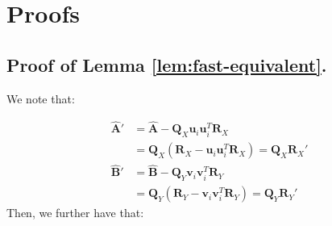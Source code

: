 \appendix
\section{Proofs}\label{app:proofs}

\subsection{Proof of Lemma \ref{lem:fast-equivalent}.} 
We note that:

\begin{align}
    \hat{\boldsymbol{A}}{'} & = \hat{\boldsymbol{A}} - \boldsymbol{Q}_X\boldsymbol{u}_i\boldsymbol{u}_i^T\boldsymbol{R}_X \nonumber \\
    & = \boldsymbol{Q}_X(\boldsymbol{R}_X - \boldsymbol{u}_i\boldsymbol{u}_i^T\boldsymbol{R}_X) = \boldsymbol{Q}_X \boldsymbol{R}_X' \nonumber  \\
    \hat{\boldsymbol{B}}{'} & = \hat{\boldsymbol{B}} - \boldsymbol{Q}_Y\boldsymbol{v}_i\boldsymbol{v}_i^T\boldsymbol{R}_Y \nonumber \\
    & = \boldsymbol{Q}_Y(\boldsymbol{R}_Y - \boldsymbol{v}_i\boldsymbol{v}_i^T\boldsymbol{R}_Y) = \boldsymbol{Q}_Y\boldsymbol{R}_Y' \nonumber
\end{align}
Then, we further have that:
